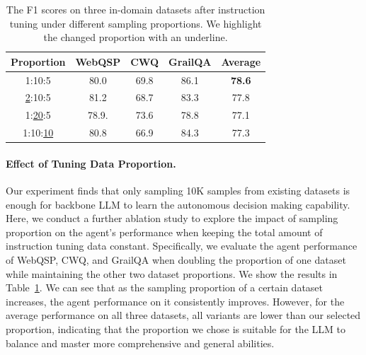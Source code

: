 \begin{table}[t]
	\centering
	\small
    \begin{tabular}{c | c c c | c}
        \toprule
          Proportion& WebQSP & CWQ & GrailQA & Average\\
        \midrule
            1:10:5 & 80.0& 69.8& 86.1 & \textbf{78.6}  \\
            \underline{2}:10:5 & 81.2& 68.7& 83.3 & 77.8 \\
            1:\underline{20}:5 & 78.9.& 73.6& 78.8 & 77.1 \\
            1:10:\underline{10} & 80.8& 66.9& 84.3 & 77.3 \\
        \bottomrule
    \end{tabular}
        \caption{The F1 scores on three in-domain datasets after instruction tuning under different sampling proportions. We highlight the changed proportion with an underline. }
        \label{tab:ablation}
\end{table}

\paragraph{Effect of Tuning Data Proportion.}
Our experiment finds that only sampling 10K samples from existing datasets is enough for backbone LLM to learn the autonomous decision making capability.
Here, we conduct a further ablation study to explore the impact of sampling proportion on the agent's performance when keeping the total amount of instruction tuning data constant.
Specifically, we evaluate the agent performance of WebQSP, CWQ, and GrailQA when doubling the proportion of one dataset while maintaining the other two dataset proportions. We show the results in Table~\ref{tab:ablation}. We can see that as the sampling proportion of a certain dataset increases, the agent performance on it consistently improves. However, for the average performance on all three datasets, all variants are lower than our selected proportion, indicating that the proportion we chose is suitable for the LLM to balance and master more comprehensive and general abilities.